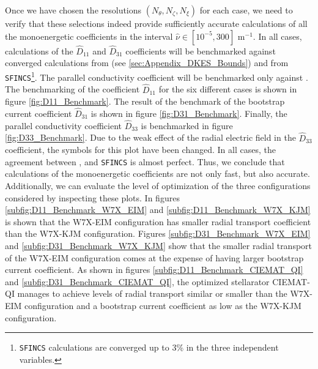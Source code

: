 Once we have chosen the resolutions $(N_\theta,N_\zeta,N_\xi)$ for each case, we need to verify that these selections indeed provide sufficiently accurate calculations of all the monoenergetic coefficients in the interval $\hat{\nu}\in[10^{-5},300]$ $\text{m}^{-1} $. In all cases, {\MONKES} calculations of the $\widehat{D}_{11}$ and $\widehat{D}_{31}$ coefficients will be benchmarked against converged calculations from {\DKES} (see \ref{sec:Appendix_DKES_Bounds}) and from \texttt{SFINCS}\footnote{\texttt{SFINCS} calculations are converged up to 3\% in the three independent variables.}. The parallel conductivity coefficient will be benchmarked only against {\DKES}. The benchmarking of the coefficient $\widehat{D}_{11}$ for the six different cases is shown in figure \ref{fig:D11_Benchmark}. The result of the benchmark of the bootstrap current coefficient $\widehat{D}_{31}$ is shown in figure \ref{fig:D31_Benchmark}. Finally, the parallel conductivity coefficient $\widehat{D}_{33}$ is benchmarked in figure \ref{fig:D33_Benchmark}. Due to the weak effect of the radial electric field in the $\widehat{D}_{33}$ coefficient, the symbols for this plot have been changed. In all cases, the agreement between {\MONKES}, {\DKES} and \texttt{SFINCS} is almost perfect. Thus, we conclude that {\MONKES} calculations of the monoenergetic coefficients are not only fast, but also accurate. Additionally, we can evaluate the level of optimization of the three configurations considered by inspecting these plots. In figures \ref{subfig:D11_Benchmark_W7X_EIM} and \ref{subfig:D11_Benchmark_W7X_KJM} is shown that the W7X-EIM configuration has smaller radial transport coefficient than the W7X-KJM configuration. Figures \ref{subfig:D31_Benchmark_W7X_EIM} and \ref{subfig:D31_Benchmark_W7X_KJM} show that the smaller radial transport of the W7X-EIM  configuration comes at the expense of having larger bootstrap current coefficient. As shown in figures \ref{subfig:D11_Benchmark_CIEMAT_QI} and \ref{subfig:D31_Benchmark_CIEMAT_QI}, the optimized stellarator CIEMAT-QI manages to achieve levels of radial transport similar or smaller than the W7X-EIM configuration and a bootstrap current coefficient as low as the W7X-KJM configuration.
%






